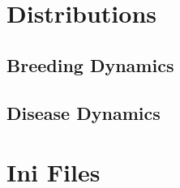 \appendix
\chapter{Distributions}
\section{Breeding Dynamics}
\section{Disease Dynamics}

\chapter{Ini Files}

